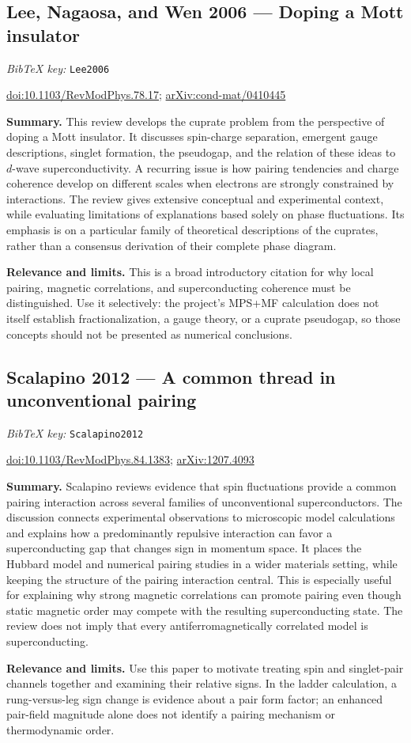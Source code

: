 \documentclass[11pt]{article}
\newcommand{\paper}[2]{\Needspace{8\baselineskip}\subsection{#2}\label{paper:#1}\textit{BibTeX key:} \texttt{#1}\quad\citep{#1}\par}
\newcommand{\doi}[1]{\href{https://doi.org/#1}{doi:#1}}
\newcommand{\arxiv}[1]{\href{https://arxiv.org/abs/#1}{arXiv:#1}}
\newcommand{\summary}{\par\textbf{Summary.} }
\newcommand{\relevance}{\par\textbf{Relevance and limits.} }
\begin{document}
\paper{Lee2006}{Lee, Nagaosa, and Wen 2006 --- Doping a Mott insulator}
\doi{10.1103/RevModPhys.78.17}; \arxiv{cond-mat/0410445}
\summary This review develops the cuprate problem from the perspective of doping a Mott insulator. It discusses spin-charge separation, emergent gauge descriptions, singlet formation, the pseudogap, and the relation of these ideas to $d$-wave superconductivity. A recurring issue is how pairing tendencies and charge coherence develop on different scales when electrons are strongly constrained by interactions. The review gives extensive conceptual and experimental context, while evaluating limitations of explanations based solely on phase fluctuations. Its emphasis is on a particular family of theoretical descriptions of the cuprates, rather than a consensus derivation of their complete phase diagram.
\relevance This is a broad introductory citation for why local pairing, magnetic correlations, and superconducting coherence must be distinguished. Use it selectively: the project's MPS+MF calculation does not itself establish fractionalization, a gauge theory, or a cuprate pseudogap, so those concepts should not be presented as numerical conclusions.

\paper{Scalapino2012}{Scalapino 2012 --- A common thread in unconventional pairing}
\doi{10.1103/RevModPhys.84.1383}; \arxiv{1207.4093}
\summary Scalapino reviews evidence that spin fluctuations provide a common pairing interaction across several families of unconventional superconductors. The discussion connects experimental observations to microscopic model calculations and explains how a predominantly repulsive interaction can favor a superconducting gap that changes sign in momentum space. It places the Hubbard model and numerical pairing studies in a wider materials setting, while keeping the structure of the pairing interaction central. This is especially useful for explaining why strong magnetic correlations can promote pairing even though static magnetic order may compete with the resulting superconducting state. The review does not imply that every antiferromagnetically correlated model is superconducting.
\relevance Use this paper to motivate treating spin and singlet-pair channels together and examining their relative signs. In the ladder calculation, a rung-versus-leg sign change is evidence about a pair form factor; an enhanced pair-field magnitude alone does not identify a pairing mechanism or thermodynamic order.
\end{document}
